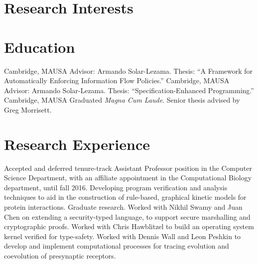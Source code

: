\documentclass[10pt,a4paper]{moderncv}
\begin{document}
\maketitle

\section{Research Interests}

\section{Education}
  {Cambridge, MA}{USA}
    {Advisor: Armando Solar-Lezama. Thesis: ``A Framework for Automatically Enforcing Information Flow Policies.''}
  {Cambridge, MA}{USA}
  {Advisor: Armando Solar-Lezama. Thesis: ``Specification-Enhanced Programming.''}
  {Cambridge, MA}{USA}
  {Graduated \emph{Magna Cum Laude}. Senior thesis advised by Greg Morrisett.}

\section{Research Experience}
  {Accepted and deferred tenure-track Assistant Professor position in the Computer Science Department, with an affiliate appointment in the Computational Biology department, until fall 2016.}
  {Developing program verification and analysis techniques to aid in the construction of rule-based, graphical kinetic models for protein interactions.}
  {Graduate research.}
  {Worked with Nikhil Swamy and Juan Chen on extending a security-typed language, to support secure marshalling and cryptographic proofs.}
  {Worked with Chris Hawblitzel to build an operating system kernel verified for type-safety.}
  {Worked with Dennis Wall and Leon Peshkin to develop and implement computational processes for tracing evolution and coevolution of presynaptic receptors.}
\end{document}
